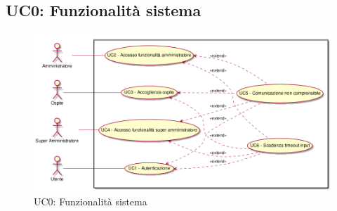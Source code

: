 \documentclass[AdR.tex]{subfiles}
\begin{document}
\subsection{UC0: Funzionalità sistema}
\label{UC0}
\begin{figure}[h]
\centering
\includegraphics[width=\textwidth,height=\textheight,keepaspectratio]{images/UseCase.png}
\caption{UC0: Funzionalità sistema}
\end{figure}
\end{document}
